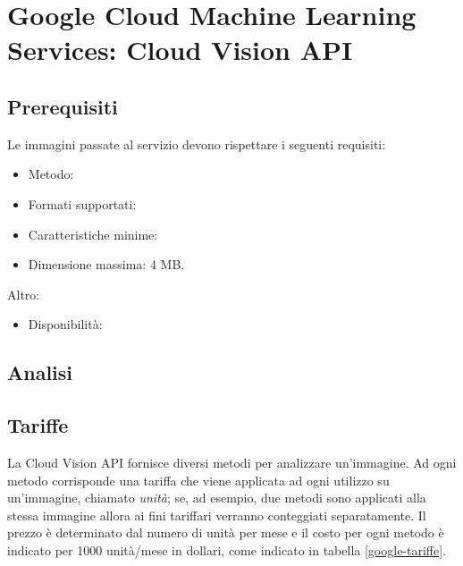 \section{Google Cloud Machine Learning Services: Cloud Vision API}

\subsection{Prerequisiti}
Le immagini passate al servizio devono rispettare i seguenti requisiti:
\begin{itemize}
\item Metodo: %
\item Formati supportati: %
\item Caratteristiche minime: %
\item Dimensione massima: 4 MB.
\end{itemize}
Altro:
\begin{itemize}
\item Disponibilità: %
\end{itemize}

\subsection{Analisi}

\subsection{Tariffe}
La Cloud Vision API fornisce diversi metodi per analizzare un'immagine.
Ad ogni metodo corrisponde una tariffa che viene applicata ad ogni utilizzo su un'immagine, chiamato \textit{unità};
se, ad esempio, due metodi sono applicati alla stessa immagine allora ai fini tariffari verranno conteggiati separatamente.
Il prezzo è determinato dal numero di unità per mese e il costo per ogni metodo è indicato per 1000 unità/mese in dollari, come indicato in tabella \ref{google-tariffe}.


